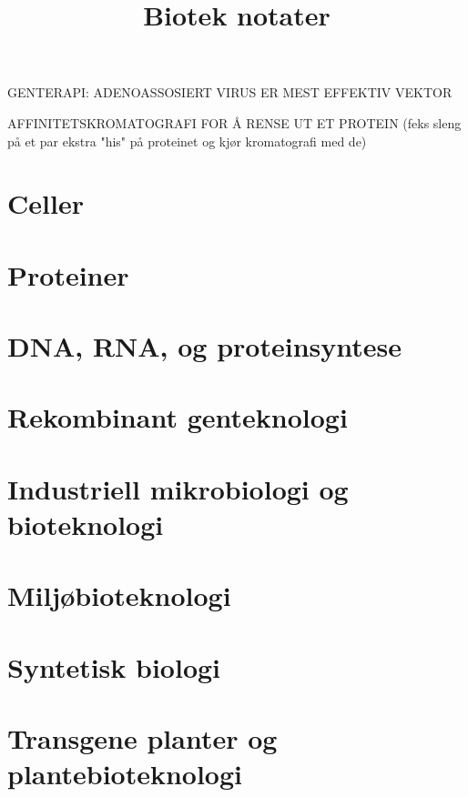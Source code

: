 

\title{Biotek notater}





    
    GENTERAPI: ADENOASSOSIERT VIRUS ER MEST EFFEKTIV VEKTOR

    AFFINITETSKROMATOGRAFI FOR Å RENSE UT ET PROTEIN (feks sleng på et par ekstra "his" på proteinet og kjør kromatografi med de)

    \section{Celler}
    

    \section{Proteiner}
    

    \section{DNA, RNA, og proteinsyntese}
    

    \section{Rekombinant genteknologi}
    

    \section{Industriell mikrobiologi og bioteknologi}
    

    \section{Miljøbioteknologi}
    

    \section{Syntetisk biologi}
    

    \section{Transgene planter og plantebioteknologi}
    

